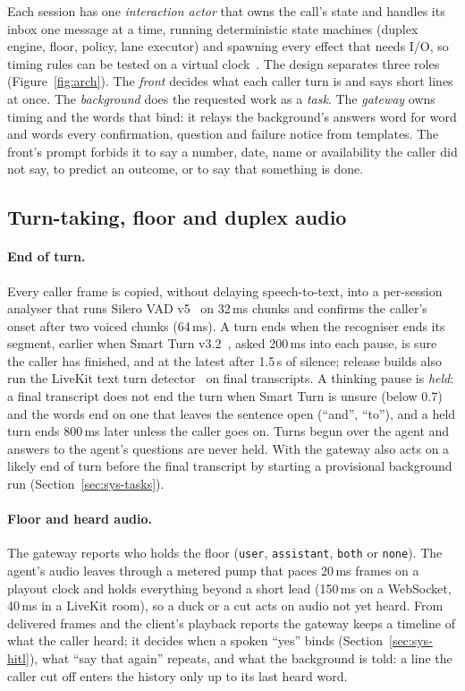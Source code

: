 Each session has one \emph{interaction actor} that owns the call's state and handles its inbox one message at a
time, running deterministic state machines (duplex engine, floor, policy, lane executor) and spawning every effect
that needs I/O, so timing rules can be tested on a virtual clock~\citep{waav_design}. The design separates three
roles (Figure~\ref{fig:arch}). The \emph{front} decides what each caller turn is and says short lines at once. The
\emph{background} does the requested work as a \emph{task}. The \emph{gateway} owns timing and the words that bind:
it relays the background's answers word for word and words every confirmation, question and failure notice from
templates. The front's prompt forbids it to say a number, date, name or availability the caller did not say, to
predict an outcome, or to say that something is done.

\subsection{Turn-taking, floor and duplex audio}\label{sec:sys-audio}

\paragraph{End of turn.}
Every caller frame is copied, without delaying speech-to-text, into a per-session analyser that runs Silero VAD
v5~\citep{silero_vad} on 32\,ms chunks and confirms the caller's onset after two voiced chunks (64\,ms). A turn ends
when the recogniser ends its segment, earlier when Smart Turn v3.2~\citep{smartturn_repo}, asked 200\,ms into each
pause, is sure the caller has finished, and at the latest after 1.5\,s of silence; release builds also run the
LiveKit text turn detector~\citep{livekit_turndetector} on final transcripts. A thinking pause is \emph{held}: a final
transcript does not end the turn when Smart Turn is unsure (below 0.7) and the words end on one that leaves the
sentence open (``and'', ``to''), and a held turn ends 800\,ms later unless the caller goes on. Turns begun over the
agent and answers to the agent's questions are never held. With  the gateway also acts on a likely
end of turn before the final transcript by starting a provisional background run (Section~\ref{sec:sys-tasks}).

\paragraph{Floor and heard audio.}
The gateway reports who holds the floor (\texttt{user}, \texttt{assistant}, \texttt{both} or \texttt{none}). The
agent's audio leaves through a metered pump that paces 20\,ms frames on a playout clock and holds everything beyond
a short lead (150\,ms on a WebSocket, 40\,ms in a LiveKit room), so a duck or a cut acts on audio not yet heard.
From delivered frames and the client's playback reports the gateway keeps a timeline of what the caller heard; it
decides when a spoken ``yes'' binds (Section~\ref{sec:sys-hitl}), what ``say that again'' repeats, and what the
background is told: a line the caller cut off enters the history only up to its last heard word.

